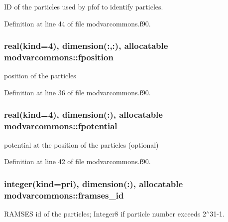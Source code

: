 I\-D of the particles used by pfof to identify particles. 



Definition at line 44 of file modvarcommons.\-f90.

\hypertarget{classmodvarcommons_ac0351b89e73074a6621ceef3a7f64e65}{
\subsubsection[{fposition}]{\setlength{\rightskip}{0pt plus 5cm}real(kind=4), dimension(\-:,\-:), allocatable modvarcommons\-::fposition}}\label{classmodvarcommons_ac0351b89e73074a6621ceef3a7f64e65}


position of the particles 



Definition at line 36 of file modvarcommons.\-f90.

\hypertarget{classmodvarcommons_a3ec54ce242c738eb8965506fe283409f}{
\subsubsection[{fpotential}]{\setlength{\rightskip}{0pt plus 5cm}real(kind=4), dimension(\-:), allocatable modvarcommons\-::fpotential}}\label{classmodvarcommons_a3ec54ce242c738eb8965506fe283409f}


potential at the position of the particles (optional) 



Definition at line 42 of file modvarcommons.\-f90.

\hypertarget{classmodvarcommons_a2c11ac48bbedcbc167820223ba89721e}{
\subsubsection[{framses\-\_\-id}]{\setlength{\rightskip}{0pt plus 5cm}integer(kind=pri), dimension(\-:), allocatable modvarcommons\-::framses\-\_\-id}}\label{classmodvarcommons_a2c11ac48bbedcbc167820223ba89721e}


R\-A\-M\-S\-E\-S id of the particles; Integer8 if particle number exceeds 2$^\wedge$31-\/1. 



